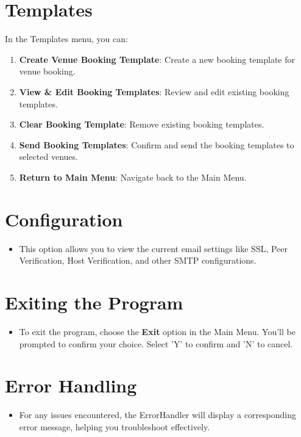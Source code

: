 \documentclass{article}
\begin{document}
\section{Templates}

In the Templates menu, you can:

\begin{enumerate}
	\item \textbf{Create Venue Booking Template}: Create a new booking template for venue booking.
	\item \textbf{View \& Edit Booking Templates}: Review and edit existing booking templates.
	\item \textbf{Clear Booking Template}: Remove existing booking templates.
	\item \textbf{Send Booking Templates}: Confirm and send the booking templates to selected venues.
	\item \textbf{Return to Main Menu}: Navigate back to the Main Menu.
\end{enumerate}

\section{Configuration}

\begin{itemize}
	\item This option allows you to view the current email settings like SSL, Peer Verification, Host Verification, and other SMTP configurations.
\end{itemize}

\section{Exiting the Program}

\begin{itemize}
	\item To exit the program, choose the \textbf{Exit} option in the Main Menu. You'll be prompted to confirm your choice. Select 'Y' to confirm and 'N' to cancel.
\end{itemize}

\section{Error Handling}

\begin{itemize}
	\item For any issues encountered, the ErrorHandler will display a corresponding error message, helping you troubleshoot effectively.
\end{itemize}
\end{document}
